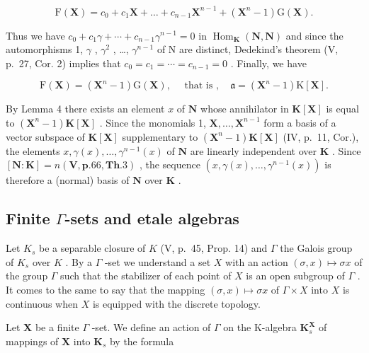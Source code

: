 \[
\mathrm{F} (\mathbf {X}) = c _ {0} + c _ {1} \mathbf {X} + \dots + c _ {n - 1} \mathbf {X} ^ {n - 1} + (\mathbf {X} ^ {n} - 1) \mathrm{G} (\mathbf {X}).\tag{11}
\]

Thus we have \(c_{0} + c_{1}\gamma + \cdots + c_{n-1}\gamma^{n-1} = 0\) in \(\operatorname{Hom}_{\mathbf{K}}(\mathbf{N}, \mathbf{N})\) and since the automorphisms 1, \(\gamma\) , \(\gamma^{2}\) , \ldots, \(\gamma^{n-1}\) of N are distinct, Dedekind's theorem (V, p.~27, Cor. 2) implies that \(c_{0} = c_{1} = \cdots = c_{n-1} = 0\) . Finally, we have

\[
\mathrm{F} (\mathbf {X}) = \left(\mathbf {X} ^ {n} - 1\right) \mathrm{G} (\mathbf {X}), \quad \text { that   is }, \quad \mathfrak {a} = \left(\mathbf {X} ^ {n} - 1\right) \mathrm{K} [ \mathbf {X} ].
\]

By Lemma 4 there exists an element \(x\) of \(\mathbf{N}\) whose annihilator in \(\mathbf{K}[\mathbf{X}]\) is equal to \((\mathbf{X}^n - 1)\mathbf{K}[\mathbf{X}]\) . Since the monomials 1, \(\mathbf{X}, \ldots, \mathbf{X}^{n-1}\) form a basis of a vector subspace of \(\mathbf{K}[\mathbf{X}]\) supplementary to \((\mathbf{X}^n - 1)\mathbf{K}[\mathbf{X}]\) (IV, p.~11, Cor.), the elements \(x, \gamma(x), \ldots, \gamma^{n-1}(x)\) of \(\mathbf{N}\) are linearly independent over \(\mathbf{K}\) . Since \([\mathbf{N}:\mathbf{K}] = n(\mathbf{V},\mathbf{p}.66,\mathbf{Th}.3)\) , the sequence \((x,\gamma(x),\ldots,\gamma^{n-1}(x))\) is therefore a (normal) basis of \(\mathbf{N}\) over \(\mathbf{K}\) .

\subsection{\texorpdfstring{Finite \(\Gamma\)-sets and etale algebras}{Finite Gamma-sets and etale algebras}}

Let \(K_s\) be a separable closure of \(K\) (V, p.~45, Prop. 14) and \(\Gamma\) the Galois group of \(K_s\) over \(K\) . By a \(\Gamma\) -set we understand a set \(X\) with an action \((\sigma, x) \mapsto \sigma x\) of the group \(\Gamma\) such that the stabilizer of each point of \(X\) is an open subgroup of \(\Gamma\) . It comes to the same to say that the mapping \((\sigma, x) \mapsto \sigma x\) of \(\Gamma \times X\) into \(X\) is continuous when \(X\) is equipped with the discrete topology.

Let \(\mathbf{X}\) be a finite \(\Gamma\) -set. We define an action of \(\Gamma\) on the K-algebra \(\mathbf{K}_s^{\mathbf{X}}\) of mappings of \(\mathbf{X}\) into \(\mathbf{K}_s\) by the formula

